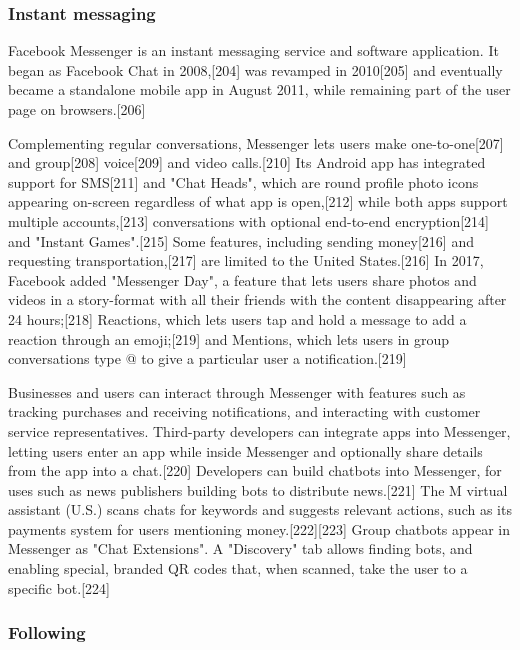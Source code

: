 \documentclass[12pt]{article}
\begin{document}
\subsubsection{Instant messaging}


Facebook Messenger is an instant messaging service and software application. It began as Facebook Chat in 2008,[204] was revamped in 2010[205] and eventually became a standalone mobile app in August 2011, while remaining part of the user page on browsers.[206]

Complementing regular conversations, Messenger lets users make one-to-one[207] and group[208] voice[209] and video calls.[210] Its Android app has integrated support for SMS[211] and "Chat Heads", which are round profile photo icons appearing on-screen regardless of what app is open,[212] while both apps support multiple accounts,[213] conversations with optional end-to-end encryption[214] and "Instant Games".[215] Some features, including sending money[216] and requesting transportation,[217] are limited to the United States.[216] In 2017, Facebook added "Messenger Day", a feature that lets users share photos and videos in a story-format with all their friends with the content disappearing after 24 hours;[218] Reactions, which lets users tap and hold a message to add a reaction through an emoji;[219] and Mentions, which lets users in group conversations type @ to give a particular user a notification.[219]

Businesses and users can interact through Messenger with features such as tracking purchases and receiving notifications, and interacting with customer service representatives. Third-party developers can integrate apps into Messenger, letting users enter an app while inside Messenger and optionally share details from the app into a chat.[220] Developers can build chatbots into Messenger, for uses such as news publishers building bots to distribute news.[221] The M virtual assistant (U.S.) scans chats for keywords and suggests relevant actions, such as its payments system for users mentioning money.[222][223] Group chatbots appear in Messenger as "Chat Extensions". A "Discovery" tab allows finding bots, and enabling special, branded QR codes that, when scanned, take the user to a specific bot.[224] 






\subsubsection{Following}
\end{document}
